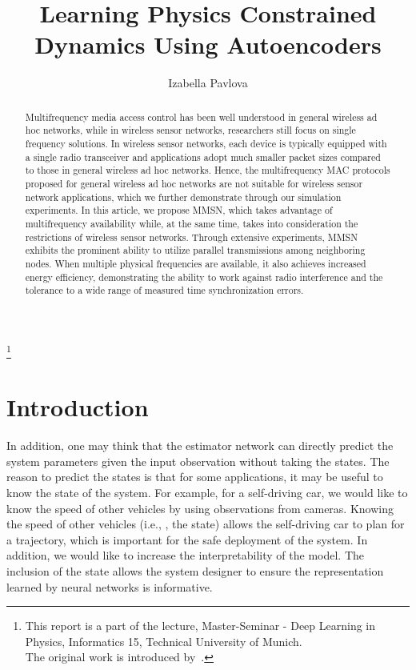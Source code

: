 \documentclass[acmtog]{techreportacmart}
\begin{document}
\title{Learning Physics Constrained Dynamics Using Autoencoders} 
\author{Izabella Pavlova}

\renewcommand\shortauthors{Pavlova}

\begin{abstract}
Multifrequency media access control has been well understood in
general wireless ad hoc networks, while in wireless sensor networks,
researchers still focus on single frequency solutions. In wireless
sensor networks, each device is typically equipped with a single
radio transceiver and applications adopt much smaller packet sizes
compared to those in general wireless ad hoc networks. Hence, the
multifrequency MAC protocols proposed for general wireless ad hoc
networks are not suitable for wireless sensor network applications,
which we further demonstrate through our simulation experiments. In
this article, we propose MMSN, which takes advantage of
multifrequency availability while, at the same time, takes into
consideration the restrictions of wireless sensor networks. Through
extensive experiments, MMSN exhibits the prominent ability to utilize
parallel transmissions among neighboring nodes. When multiple physical
frequencies are available, it also achieves increased energy
efficiency, demonstrating the ability to work against radio
interference and the tolerance to a wide range of measured time
synchronization errors.
\end{abstract}

%
%



\thanks{This report is a part of the lecture, Master-Seminar - Deep Learning in Physics, Informatics 15, Technical University of Munich.
\\
The original work is introduced by~\cite{NEURIPS2022_6d5e0357}.}
\maketitle


\section{Introduction} %
In addition, one may think that the estimator network can directly predict the system parameters given the input observation without taking the states. The reason to predict the states is that for some applications, it may be useful to know the state of the system. For example, for a self-driving car, we would like to know the speed of other vehicles by using observations from cameras. Knowing the speed of other vehicles (i.e., , the state) allows the self-driving car to plan for a trajectory, which is important for the safe deployment of the system. In addition, we would like to increase the interpretability of the model. The inclusion of the state allows the system designer to ensure the representation learned by neural networks is informative.
\end{document}
